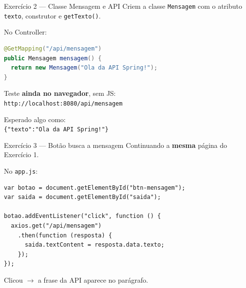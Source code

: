 \documentclass[aspectratio=169,11pt]{beamer}
\begin{document}
\begin{frame}[fragile]{Exercício 2 --- Classe Mensagem e API}
  Criem a classe \texttt{Mensagem} com o atributo \texttt{texto},
  construtor e \texttt{getTexto()}.

  \vspace{0.3em}
  No Controller:

\begin{lstlisting}[language=Java,basicstyle=\ttfamily\footnotesize]
@GetMapping("/api/mensagem")
public Mensagem mensagem() {
  return new Mensagem("Ola da API Spring!");
}
\end{lstlisting}

  \vspace{0.4em}
  Teste \textbf{ainda no navegador}, sem JS:\\
  \texttt{http://localhost:8080/api/mensagem}

  \vspace{0.3em}
  Esperado algo como:\\
  \texttt{\{"texto":"Ola da API Spring!"\}}
\end{frame}

\begin{frame}[fragile]{Exercício 3 --- Botão busca a mensagem}
  Continuando a \textbf{mesma} página do Exercício 1.

  \vspace{0.3em}
  No \texttt{app.js}:
\begin{lstlisting}[basicstyle=\ttfamily\footnotesize]
var botao = document.getElementById("btn-mensagem");
var saida = document.getElementById("saida");

botao.addEventListener("click", function () {
  axios.get("/api/mensagem")
    .then(function (resposta) {
      saida.textContent = resposta.data.texto;
    });
});
\end{lstlisting}

  \vspace{0.3em}
  Clicou $\rightarrow$ a frase da API aparece no parágrafo.
\end{frame}
\end{document}
